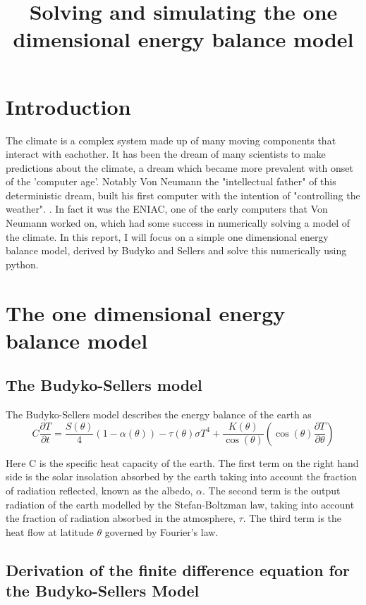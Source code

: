 \documentclass{article}%
\title{Solving and simulating the one dimensional energy balance model}%
\date{}
\begin{document}
%
\normalsize%
\maketitle%

%
\section{Introduction}%
\label{sec:Introduction}%
The climate is a complex system made up of many moving components that interact with eachother.
It has been the dream of many scientists to make predictions about the climate, a dream which became more prevalent with onset of the 'computer age'. Notably Von Neumann the "intellectual father" of this deterministic dream, built his first computer with the
intention of "controlling the weather". \cite{Gleick}. In fact it was the ENIAC, one of the early computers that Von Neumann worked on, which had some success in numerically solving a model of the climate. \cite{Charney}
In this report, I will focus on a simple one dimensional energy balance model, derived by Budyko \cite{Budyko} and Sellers \cite{Sellers} and solve this numerically using python.
%
\section{The one dimensional energy balance model}

\subsection{The Budyko-Sellers model}
The Budyko-Sellers model describes the energy balance of the earth as
\begin{equation}
  C \frac{\partial T}{\partial t} = \frac{S(\theta)}{4} (1 - \alpha(\theta)) - \tau(\theta)\sigma T^{4} + \frac{K(\theta)}{\cos(\theta)} (\cos(\theta)\frac{\partial T}{\partial \theta})
\end{equation}

Here C is the specific heat capacity of the earth. The first term on the right hand side is the solar insolation absorbed by the earth taking into account the fraction of radiation reflected, known as the albedo, $ \alpha$. The second term is the output radiation of the earth modelled by the Stefan-Boltzman law, taking into account the fraction of radiation absorbed in the atmosphere, $\tau$. 
The third term is the heat flow at latitude $ \theta $ governed by Fourier's law. 

\subsection{Derivation of the finite difference equation for the Budyko-Sellers Model}%
\label{sec:Derivation of the finite difference equation for the Budyko-Sellers Model}%
\end{document}
